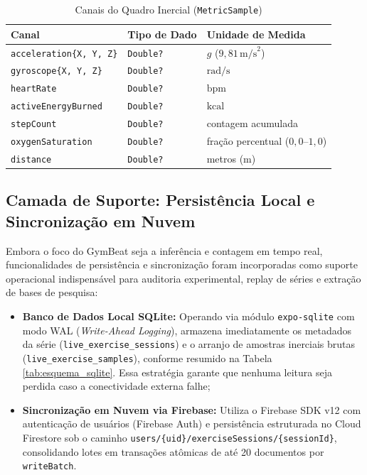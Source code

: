 \documentclass[12pt]{article}
\begin{document}
\begin{table}[ht]
\centering
\caption{Canais do Quadro Inercial (\texttt{MetricSample})}
\label{tab:canais_metricsample}
\small
\begin{tabular}{lll}
\toprule
\textbf{Canal} & \textbf{Tipo de Dado} & \textbf{Unidade de Medida} \\
\midrule
\texttt{acceleration\{X, Y, Z\}} & \texttt{Double?} & $g$ ($9{,}81\,\text{m/s}^2$) \\
\texttt{gyroscope\{X, Y, Z\}} & \texttt{Double?} & $\text{rad/s}$ \\
\texttt{heartRate} & \texttt{Double?} & $\text{bpm}$ \\
\texttt{activeEnergyBurned} & \texttt{Double?} & $\text{kcal}$ \\
\texttt{stepCount} & \texttt{Double?} & contagem acumulada \\
\texttt{oxygenSaturation} & \texttt{Double?} & fração percentual ($0{,}0$--$1{,}0$) \\
\texttt{distance} & \texttt{Double?} & metros ($\text{m}$) \\
\bottomrule
\end{tabular}
\end{table}

\subsection{Camada de Suporte: Persistência Local e Sincronização em Nuvem}

Embora o foco do GymBeat seja a inferência e contagem em tempo real, funcionalidades de persistência e sincronização foram incorporadas como suporte operacional indispensável para auditoria experimental, replay de séries e extração de bases de pesquisa:

\begin{itemize}
    \item \textbf{Banco de Dados Local SQLite:} Operando via módulo \texttt{expo-sqlite} com modo WAL (\textit{Write-Ahead Logging}), armazena imediatamente os metadados da série (\texttt{live\_exercise\_sessions}) e o arranjo de amostras inerciais brutas (\texttt{live\_exercise\_samples}), conforme resumido na Tabela \ref{tab:esquema_sqlite}. Essa estratégia garante que nenhuma leitura seja perdida caso a conectividade externa falhe;
    \item \textbf{Sincronização em Nuvem via Firebase:} Utiliza o Firebase SDK v12 com autenticação de usuários (Firebase Auth) e persistência estruturada no Cloud Firestore sob o caminho \texttt{users/\{uid\}/exerciseSessions/\{sessionId\}}, consolidando lotes em transações atômicas de até 20 documentos por \texttt{writeBatch}.
\end{itemize}
\end{document}
